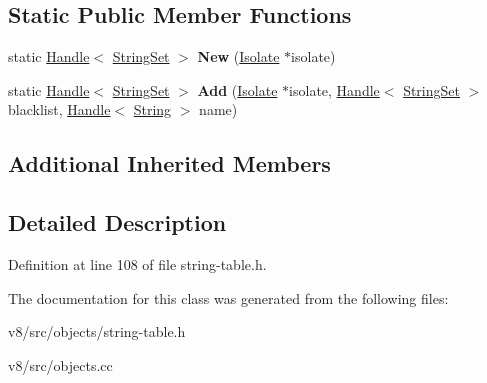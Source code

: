 \subsection*{Static Public Member Functions}
\begin{DoxyCompactItemize}
\item 
\mbox{\label{classv8_1_1internal_1_1StringSet_aa6784ef9bec1c541906f28a47e719db8}} 
static \mbox{\hyperlink{classv8_1_1internal_1_1Handle}{Handle}}$<$ \mbox{\hyperlink{classv8_1_1internal_1_1StringSet}{String\+Set}} $>$ {\bfseries New} (\mbox{\hyperlink{classv8_1_1internal_1_1Isolate}{Isolate}} $\ast$isolate)
\item 
\mbox{\label{classv8_1_1internal_1_1StringSet_af4895c66ad30f3d1c2bfbc6364a8cb4a}} 
static \mbox{\hyperlink{classv8_1_1internal_1_1Handle}{Handle}}$<$ \mbox{\hyperlink{classv8_1_1internal_1_1StringSet}{String\+Set}} $>$ {\bfseries Add} (\mbox{\hyperlink{classv8_1_1internal_1_1Isolate}{Isolate}} $\ast$isolate, \mbox{\hyperlink{classv8_1_1internal_1_1Handle}{Handle}}$<$ \mbox{\hyperlink{classv8_1_1internal_1_1StringSet}{String\+Set}} $>$ blacklist, \mbox{\hyperlink{classv8_1_1internal_1_1Handle}{Handle}}$<$ \mbox{\hyperlink{classv8_1_1internal_1_1String}{String}} $>$ name)
\end{DoxyCompactItemize}
\subsection*{Additional Inherited Members}


\subsection{Detailed Description}


Definition at line 108 of file string-\/table.\+h.



The documentation for this class was generated from the following files\+:\begin{DoxyCompactItemize}
\item 
v8/src/objects/string-\/table.\+h\item 
v8/src/objects.\+cc\end{DoxyCompactItemize}
